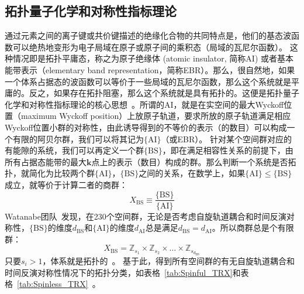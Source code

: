 \subsection{拓扑量子化学和对称性指标理论}
通过元素之间的离子键或共价键描述的绝缘化合物的共同特点是，他们的基态波函数可以绝热地变形为电子局域在原子或原子间的乘积态（局域的瓦尼尔函数）。 这种情况即是拓扑平庸态，称之为原子绝缘体 (atomic insulator, 简称AI) 或者基本能带表示（elementary band representation，简称EBR）。那么，很自然地，如果一个体系占据态的波函数可以等价于一些局域的瓦尼尔函数，那么这个系统就是平庸的。反之，如果存在拓扑阻塞，那么这个系统就是具有拓扑的。这便是拓扑量子化学和对称性指标理论的核心思想~\citep{nc_ashvin,tqc2017}。所谓的AI，就是在实空间的最大Wyckoff位置（maximum Wyckoff position）上放原子轨道，要求所放的原子轨道满足相应Wyckoff位置小群的对称性，由此诱导得到的不等价的表示（的数目）可以构成一个有限的阿贝尔群，我们可以将其记为$\{\textrm{AI}\}$（或EBR）。 针对某个空间群对应的有能隙的系统，我们可以再定义一个群$\{\textrm{BS}\}$，即在满足相容性关系的前提下，由所有占据态能带的最大$\mathbf{k}$点上的表示（数目）构成的群。那么判断一个系统是否拓扑，就简化为比较两个群$\{\textrm{AI}\}$，$\{\textrm{BS}\}$之间的关系，在数学上，如果$\{\textrm{AI}\} \le \{\textrm{BS}\}$成立，就等价于计算二者的商群：
\begin{equation}
    \label{eq:1-12}
    X_{\mathrm{BS}} \equiv \frac{\{\mathrm{BS}\}}{\{\mathrm{AI}\}}
\end{equation}
Watanabe团队~\citep{nc_ashvin}发现，在230个空间群，无论是否考虑自旋轨道耦合和时间反演对称性，$\{\textrm{BS}\}$的维度$d_{\mathrm{BS}}$和$\{\textrm{AI}\}$的维度$d_{\mathrm{AI}}$总是满足$d_{\mathrm{BS}}=d_{\mathrm{AI}}$。所以商群总是个有限群：
\begin{equation}
    \label{eq:1-13}
    X_{\mathrm{BS}}=\mathbb{Z}_{s_{1}} \times \mathbb{Z}_{s_{2}} \times \ldots \times \mathbb{Z}_{s_{d_{\mathrm{BS}}}}
\end{equation}
只要$s_{i}>1$，体系就是拓扑的~\citep{nc_ashvin,Po2020}。
基于此，得到所有空间群的有无自旋轨道耦合和时间反演对称性情况下的拓扑分类，如表格~\ref{tab:Spinful_TRX}和表格~\ref{tab:Spinless_TRX}~\citep{nc_ashvin}。

